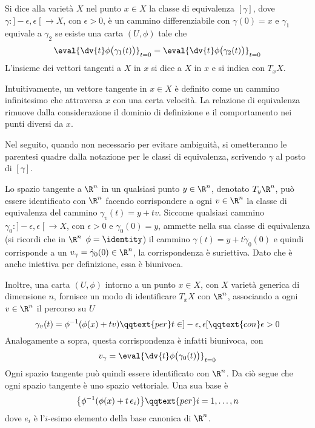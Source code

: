 \begin{definition}
  Si dice  alla varietà $X$ nel punto $x \in  X$ la classe di equivalenza $[\gamma]$, dove $\gamma:]-\epsilon,\epsilon\;[\ \to X$, con $\epsilon > 0$, è un cammino differenziabile con $\gamma(0) = x$ e $\gamma_1$ equivale a $\gamma_2$ se esiste una carta $(U, \phi)$ tale che \begin{equation*}
  \eval{\dv{t} \phi \big(\gamma_1(t)\big)}_{t=0} = \eval{\dv{t} \phi\big(\gamma_2(t)\big)}_{t=0}
  \end{equation*} 
  L'insieme dei vettori tangenti a $X$ in $x$ si dice  a $X$ in $x$ e si indica con $T_x X$.
\end{definition}
\begin{remark}
  Intuitivamente, un vettore tangente in $x \in X$ è definito come un cammino infinitesimo che attraversa $x$ con una certa velocità. La relazione di equivalenza rimuove dalla considerazione il dominio di definizione e il comportamento nei punti diversi da $x$.
\end{remark}
Nel seguito, quando non necessario per evitare ambiguità, si ometteranno le parentesi quadre dalla notazione per le classi di equivalenza, scrivendo $\gamma$ al posto di $[\gamma]$.

Lo spazio tangente a $\R^{n}$ in un qualsiasi punto $y \in \R^{n}$, denotato $T_y \R^{n}$, può essere identificato con $\R^{n}$ facendo corrispondere a ogni $v \in \R^{n}$ la classe di equivalenza del cammino $\gamma_v(t) = y + tv$. Siccome qualsiasi cammino $\gamma_0:]-\epsilon,\epsilon\;[\ \to X$, con $\epsilon > 0$ e $\gamma_0(0)=y$, ammette nella sua classe di equivalenza (si ricordi che in $\R^{n}$ $\phi = \identity$) il cammino $\gamma(t) = y + t\dot{\gamma}_0(0)$ e quindi corrisponde a un $v_{\gamma} = \dot{\gamma}_0(0) \in \R^{n}$, la corrispondenza è suriettiva. Dato che è anche iniettiva per definizione, essa è biunivoca. 

Inoltre, una carta $(U, \phi)$ intorno a un punto $x \in  X$, con $X$ varietà generica di dimensione $n$, fornisce un modo di identificare $T_x X$ con $\R^{n}$, associando a ogni $v \in \R^{n}$ il percorso su $U$ \begin{equation} \label{eq:tangentRn}
  \gamma_{v}(t) = \phi^{-1}(\phi(x)+tv) \qqtext{per} t \in ]-\epsilon, \epsilon[ \qqtext{con} \epsilon > 0
\end{equation} Analogamente a sopra, questa corrispondenza è infatti biunivoca, con \begin{equation*} \label{eq:tangentCoords}
v_{\gamma} = \eval{\dv{t} \phi\big( \gamma_0(t)\big)}_{t=0}
\end{equation*} Ogni spazio tangente può quindi essere identificato con $\R^{n}$. Da ciò segue che ogni spazio tangente è uno spazio vettoriale. Una sua base è \begin{equation} \label{eq:tangentRnBase}
  \big\lbrace\phi^{-1}(\phi(x)+t\, e_i)\big\rbrace \qqtext{per} i=1, \ldots, n
\end{equation}
dove $e_i$ è l'$i$-esimo elemento della base canonica di $\R^{n}$.

